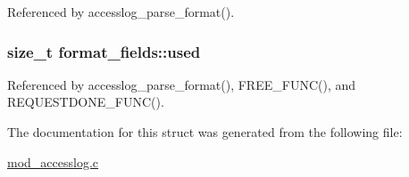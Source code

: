 Referenced by accesslog\-\_\-parse\-\_\-format().

\hypertarget{structformat__fields_ab0dab4eaa6b3d9ea8966650ab73e41b0}{
\subsubsection[{used}]{\setlength{\rightskip}{0pt plus 5cm}size\-\_\-t format\-\_\-fields\-::used}}\label{structformat__fields_ab0dab4eaa6b3d9ea8966650ab73e41b0}


Referenced by accesslog\-\_\-parse\-\_\-format(), F\-R\-E\-E\-\_\-\-F\-U\-N\-C(), and R\-E\-Q\-U\-E\-S\-T\-D\-O\-N\-E\-\_\-\-F\-U\-N\-C().



The documentation for this struct was generated from the following file\-:\begin{DoxyCompactItemize}
\item 
\hyperlink{mod__accesslog_8c}{mod\-\_\-accesslog.\-c}\end{DoxyCompactItemize}
